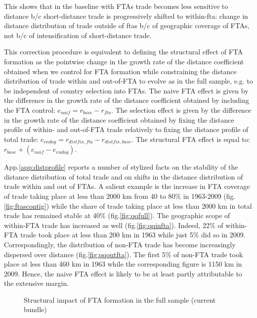 \documentclass[12pt,twoside,a4paper,notitlepage]{article}
\begin{document}
This shows that in the baseline with FTAs trade becomes less sensitive to distance b/c short-distance trade is progressively shifted to within-fta: change in distance distribution of trade outside of ftas b/c of geographic coverage of FTAs, not b/c of intensification of short-distance trade.

This correction procedure is equivalent to defining the structural effect of FTA formation as the pointwise change in the growth rate of the distance coefficient obtained when we control for FTA formation while constraining the distance distribution of trade within and out-of-FTA to evolve as in the full sample, e.g.
to be independent of country selection into FTAs.
The naive FTA effect is given by the difference in the growth rate of the distance coefficient obtained by including the FTA control: $e_{naif}=r_{base}-r_{fta}$.
The selection effect is given by the difference in the growth rate of the distance coefficient obtained by fixing the distance profile of within- and out-of-FTA trade relatively to fixing the distance profile of total trade: $e_{endog}=r_{distfix,fta}-r_{distfix,base}$.
The structural FTA effect is equal to: $r_{base}+(e_{naif}-e_{endog})$.


App.\ref{app:distprofile} reports a number of stylized facts on the stability of the distance distribution of total trade and on shifts in the distance distribution of trade within and out of FTAs.
A salient example is the increase in FTA coverage of trade taking place at less than 2000 km from 40 to 80\% in 1963-2009 (fig.\ref{fig:ftascontig}) while the share of trade taking place at less than 2000 km in total trade has remained stable at 40\% (fig.\ref{fig:qqfull}).
The geographic scope of within-FTA trade has increased as well (fig.\ref{fig:qqinfta}).
Indeed, 22\% of within-FTA trade took place at less than 200 km in 1963 while just 5\% did so in 2009.
Correspondingly, the distribution of non-FTA trade has become increasingly dispersed over distance (fig.\ref{fig:qqoutfta}).
The first 5\% of non-FTA trade took place at less than 460 km in 1963 while the corresponding figure is 1150 km in 2009.
Hence, the naive FTA effect is likely to be at least partly attributable to the extensive margin.
 

\begin{figure}[h!]
\caption{Structural impact of FTA formation in the full sample (current bundle) \label{fig:ftacorrfull}}
\begin{center}
\setlength{\fboxrule}{1pt} %
\setlength{\fboxsep}{.1in} %
\end{center}
\end{figure}   
\end{document}
